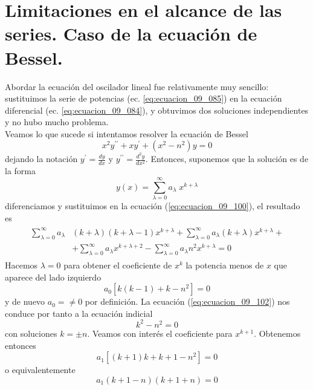\section*{Limitaciones en el alcance de las series. Caso de la ecuación de Bessel.}
Abordar la ecuación del oscilador lineal fue relativamente muy sencillo: sustituimos la serie de potencias (ec. \ref{eq:ecuacion_09_085}) en la ecuación diferencial (ec. \ref{eq:ecuacion_09_084}), y obtuvimos dos soluciones independientes y no hubo mucho problema.
\\
Veamos lo que sucede si intentamos resolver la ecuación de Bessel
\begin{equation}
x^{2} y^{\prime \prime} +  x y^{\prime} + (x^{2} - n^{2}) y = 0
\label{eq:ecuacion_09_100}
\end{equation}
dejando la notación $y^{\prime} = \frac{dy}{dx}$ y $y^{\prime \prime} = \frac{d^{2} y}{d x^{2}}$. Entonces, suponemos que la solución es de la forma
\[ y(x) = \sum_{\lambda=0}^{\infty} a_{\lambda} \; x^{k + \lambda} \]
diferenciamos y sustituimos en la ecuación (\ref{eq:ecuacion_09_100}), el resultado es
\begin{eqnarray*}
\begin{aligned}
\sum_{\lambda=0}^{\infty} a_{\lambda} & (k + \lambda)(k + \lambda - 1) x^{k + \lambda} + \sum_{\lambda=0}^{\infty} a_{\lambda} (k + \lambda) x^{k + \lambda} + \nonumber \\
& + \sum_{\lambda=0}^{\infty} a_{\lambda} x^{k + \lambda + 2} - \sum_{\lambda=0}^{\infty} a_{\lambda} n^{2} x^{k + \lambda}  = 0
\end{aligned}
\label{eq:ecuacion_09_101}
\end{eqnarray*}
Hacemos $\lambda=0$ para obtener el coeficiente de $x^{k}$ la potencia menos de $x$ que aparece del lado izquierdo
\begin{equation}
a_{0} [ k (k - 1) + k - n^{2} ] = 0
\label{eq:ecuacion_09_102}
\end{equation}
y de nuevo $a_{0} = \neq 0$ por definición. La ecuación (\ref{eq:ecuacion_09_102}) nos conduce por tanto a la ecuación indicial
\begin{equation}
k^{2} - n^{2} = 0
\label{eq:ecuacion_09_103}
\end{equation}
con soluciones $k = \pm n$.
Veamos con interés el coeficiente para $x^{k+1}$. Obtenemos entonces
\[ a_{1} [(k + 1) k + k + 1 - n^{2} ] = 0 \]
o equivalentemente
\begin{equation}
a_{1} (k + 1 - n)(k + 1 + n) = 0
\label{eq:ecuacion_09_104}
\end{equation}
